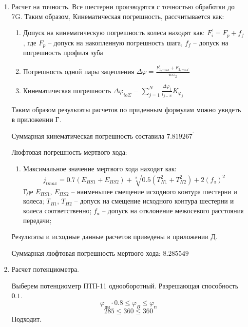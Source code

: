 \documentclass{article}
\begin{document}
\begin{enumerate}
	\item Расчет на точность.
	Все шестерни производятся с точностью обработки до 7G. Таким образом, Кинематическая погрешность, рассчитывается как:
	\begin{enumerate}
		\item Допуск на кинематическую погрешность колеса находят как: $ F_{i}^{'} = F_p + f_f$, где $F_p$ -- допуск на накопленную погрешность шага, $f_f$ -- допуск на погрешность профиля зуба
		\item Погрешность одной пары зацепления $ \Delta \varphi = \frac{F_{1,max}^{'} + F_{2,max^{'}}}{m z_2} $
		\item Кинематическая погрешность $ \Delta \varphi_{io \Sigma} = \sum\limits_{j=1}^{N} { \frac{ \Delta \varphi_j}{i_{j-N}}} K_{\varphi_j}$
	\end{enumerate}
	Таким образом результаты расчетов по приденным формулам можно увидеть в приложении Г.
	
	Суммарная кинематическая погрешность составила $7.819267^{'}$

	Люфтовая погрешность мертвого хода:
	\begin{enumerate}
		\item Максимальное значение мертвого хода находят как:
		$$
		j_{t max} = 0.7(E_{HS1} + E_{HS2}) + \sqrt[2]{0.5(T_{H1}^2 + T_{H2}^2) + 2 (f_a)^2}
		$$
		Где $E_{HS1}$, $E_{HS2}$ -- наименьшее смещение исходного контура шестерни и колеса; $T_{H1}$, $T_{H2}$ -- допуск на смещение исходного контура шестерни и колеса соответственно; $f_a$ -- допуск на отклонение межосевого расстояния передачи;
	\end{enumerate}
	Результаты и исходные данные расчетов приведены в приложении Д.

	Суммарная люфтовая погрешность мертвого хода: $8.285549$
	
	\item Расчет потенциометра.
	
	Выберем потенциометр ПТП-11 однооборотный. Разрешающая способность $0.1$.
	$$
	\varphi_{пн} \cdot 0.8 \le \varphi_{B} \le \varphi_{п}
	$$
	$$
	285 \le 360 \le 360
	$$
	Подходит.
\end{enumerate}
	
\end{document}
